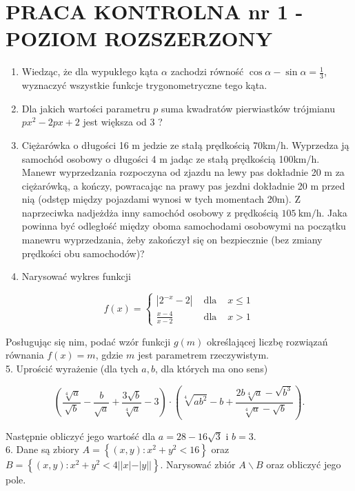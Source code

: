 \documentclass[10pt]{article}
\begin{document}
\section*{PRACA KONTROLNA nr 1 - POZIOM ROZSZERZONY}
\begin{enumerate}
  \item Wiedząc, że dla wypukłego kąta $\alpha$ zachodzi równość $\cos \alpha-\sin \alpha=\frac{1}{3}$, wyznaczyć wszystkie funkcje trygonometryczne tego kąta.
  \item Dla jakich wartości parametru $p$ suma kwadratów pierwiastków trójmianu $p x^{2}-2 p x+2$ jest większa od 3 ?
  \item Ciężarówka o długości 16 m jedzie ze stałą prędkością 70km/h. Wyprzedza ją samochód osobowy o długości 4 m jadąc ze stałą prędkością 100km/h. Manewr wyprzedzania rozpoczyna od zjazdu na lewy pas dokładnie 20 m za ciężarówką, a kończy, powracając na prawy pas jezdni dokładnie 20 m przed nią (odstęp między pojazdami wynosi w tych momentach 20m). Z naprzeciwka nadjeżdża inny samochód osobowy z prędkością $105 \mathrm{~km} / \mathrm{h}$. Jaka powinna być odległość między oboma samochodami osobowymi na początku manewru wyprzedzania, żeby zakończył się on bezpiecznie (bez zmiany prędkości obu samochodów)?
  \item Narysować wykres funkcji
\end{enumerate}

$$
f(x)=\left\{\begin{array}{lll}
\left|2^{-x}-2\right| & \text { dla } & x \leqslant 1 \\
\frac{x-4}{x-2} & \text { dla } & x>1
\end{array}\right.
$$

Posługując się nim, podać wzór funkcji $g(m)$ określającej liczbę rozwiązań równania $f(x)=m$, gdzie $m$ jest parametrem rzeczywistym.\\
5. Uprościć wyrażenie (dla tych $a, b$, dla których ma ono sens)

$$
\left(\frac{\sqrt[4]{a}}{\sqrt{b}}-\frac{b}{\sqrt{a}}+\frac{3 \sqrt{b}}{\sqrt[4]{a}}-3\right) \cdot\left(\sqrt[4]{a b^{2}}-b+\frac{2 b \sqrt[4]{a}-\sqrt{b^{3}}}{\sqrt[4]{a}-\sqrt{b}}\right) .
$$

Następnie obliczyć jego wartość dla $a=28-16 \sqrt{3}$ i $b=3$.\\
6. Dane są zbiory $A=\left\{(x, y): x^{2}+y^{2}<16\right\}$ oraz $B=\left\{(x, y): x^{2}+y^{2}<4| | x|-|y||\right\}$. Narysować zbiór $A \backslash B$ oraz obliczyć jego pole.
\end{document}
